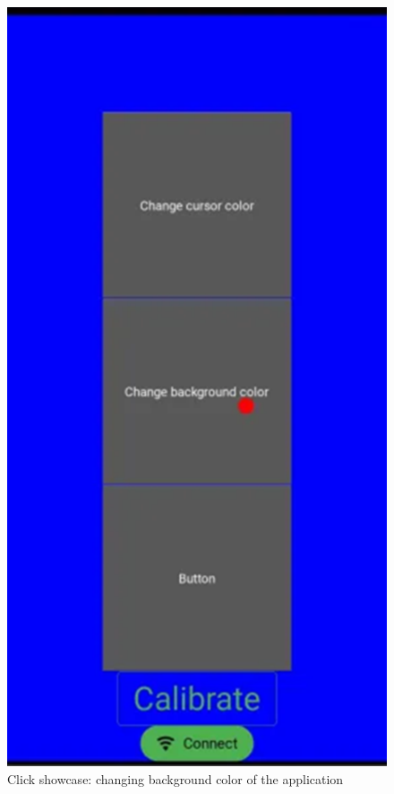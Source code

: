\documentclass[12pt,a4paper]{article}
\begin{document}
\begin{figure}[htbp]
    \centering
    \includegraphics[scale=0.4]{../IoT Materials/article images/12-Screen-showcase-click.png}
    \caption{Click showcase: changing background color of the application}
\end{figure}
\end{document}
